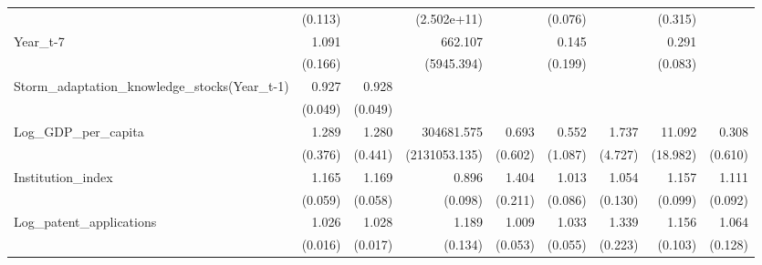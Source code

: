 \begin{table}[htbp]
\begin{tabular}{l*{8}{D{.}{.}{-1}}}
                    &     (0.113)         &                     & (2.502e+11)         &                     &     (0.076)         &                     &     (0.315)         &                     \\
Year\_t-7            &       1.091         &                     &     662.107         &                     &       0.145         &                     &       0.291\sym{***}&                     \\
                    &     (0.166)         &                     &  (5945.394)         &                     &     (0.199)         &                     &     (0.083)         &                     \\
Storm\_adaptation\_knowledge\_stocks(Year\_t-1)&       0.927         &       0.928         &                     &                     &                     &                     &                     &                     \\
                    &     (0.049)         &     (0.049)         &                     &                     &                     &                     &                     &                     \\
Log\_GDP\_per\_capita  &       1.289         &       1.280         &  304681.575\sym{*}  &       0.693         &       0.552         &       1.737         &      11.092         &       0.308         \\
                    &     (0.376)         &     (0.441)         &(2131053.135)         &     (0.602)         &     (1.087)         &     (4.727)         &    (18.982)         &     (0.610)         \\
Institution\_index   &       1.165\sym{***}&       1.169\sym{***}&       0.896         &       1.404\sym{**} &       1.013         &       1.054         &       1.157\sym{*}  &       1.111         \\
                    &     (0.059)         &     (0.058)         &     (0.098)         &     (0.211)         &     (0.086)         &     (0.130)         &     (0.099)         &     (0.092)         \\
Log\_patent\_applications&       1.026         &       1.028\sym{*}  &       1.189         &       1.009         &       1.033         &       1.339\sym{*}  &       1.156         &       1.064         \\
                    &     (0.016)         &     (0.017)         &     (0.134)         &     (0.053)         &     (0.055)         &     (0.223)         &     (0.103)         &     (0.128)         \\

\end{tabular}
\end{table}
